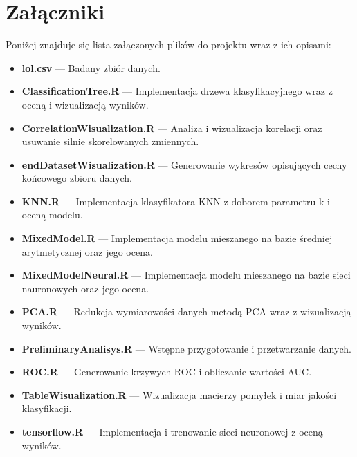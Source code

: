 \documentclass[twoside]{customStyle}
\begin{document}
\section*{Załączniki}
Poniżej znajduje się lista załączonych plików do projektu wraz z ich opisami:
\begin{itemize}
\item \textbf{lol.csv} --- Badany zbiór danych.
\item \textbf{ClassificationTree.R} --- Implementacja drzewa klasyfikacyjnego wraz z oceną i wizualizacją wyników.
\item \textbf{CorrelationWisualization.R} --- Analiza i wizualizacja korelacji oraz usuwanie silnie skorelowanych zmiennych.
\item \textbf{endDatasetWisualization.R} --- Generowanie wykresów opisujących cechy końcowego zbioru danych.
\item \textbf{KNN.R} --- Implementacja klasyfikatora KNN z doborem parametru k i oceną modelu.
\item \textbf{MixedModel.R} --- Implementacja modelu mieszanego na bazie średniej arytmetycznej oraz jego ocena.
\item \textbf{MixedModelNeural.R} --- Implementacja modelu mieszanego na bazie sieci nauronowych oraz jego ocena.
\item \textbf{PCA.R} --- Redukcja wymiarowości danych metodą PCA wraz z wizualizacją wyników.
\item \textbf{PreliminaryAnalisys.R} --- Wstępne przygotowanie i przetwarzanie danych.
\item \textbf{ROC.R} --- Generowanie krzywych ROC i obliczanie wartości AUC.
\item \textbf{TableWisualization.R} --- Wizualizacja macierzy pomyłek i miar jakości klasyfikacji.
\item \textbf{tensorflow.R} --- Implementacja i trenowanie sieci neuronowej z oceną wyników.
\end{itemize}
\end{document}
